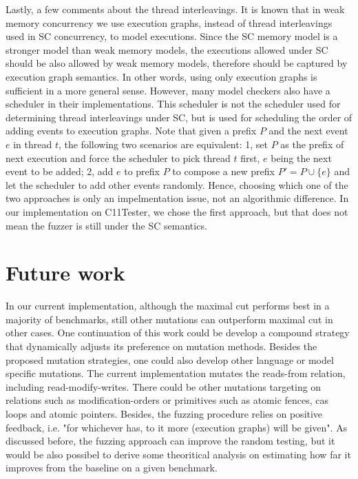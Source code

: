 Lastly, a few comments about the thread interleavings. It is known that in weak memory concurrency we use execution graphs, instead of thread interleavings used in SC concurrency, to model executions. Since the SC memory model is a stronger model than weak memory models, the executions allowed under SC should be also allowed by weak memory models, therefore should be captured by execution graph semantics. In other words, using only execution graphs is sufficient in a more general sense. However, many model checkers also have a scheduler in their implementations. This scheduler is not the scheduler used for determining thread interleavings under SC, but is used for scheduling the order of adding events to execution graphs. Note that given a prefix $P$ and the next event $e$ in thread $t$, the following two scenarios are equivalent: 1, set $P$ as the prefix of next execution and force the scheduler to pick thread $t$ first, $e$ being the next event to be added; 2, add $e$ to prefix $P$ to compose a new prefix $P' = P \cup \{e\}$ and let the scheduler to add other events randomly. Hence, choosing which one of the two approaches is only an impelmentation issue, not an algorithmic difference. In our implementation on C11Tester, we chose the first approach, but that does not mean the fuzzer is still under the SC semantics.


\section{Future work}

In our current implementation, although the maximal cut performs best in a majority of benchmarks, still other mutations can outperform maximal cut in other cases. One continuation of this work could be develop a compound strategy that dynamically adjusts its preference on mutation methods. Besides the proposed mutation strategies, one could also develop other language or model specific mutations. The current implementation mutates the reads-from relation, including read-modify-writes. There could be other mutations targeting on relations such as modification-orders or primitives such as atomic fences, cas loops and atomic pointers. Besides, the fuzzing procedure relies on positive feedback, i.e. "for whichever has, to it more (execution graphs) will be given". As discussed before, the fuzzing approach can improve the random testing, but it would be also possibel to derive some theoritical analysis on estimating how far it improves from the baseline on a given benchmark. 

